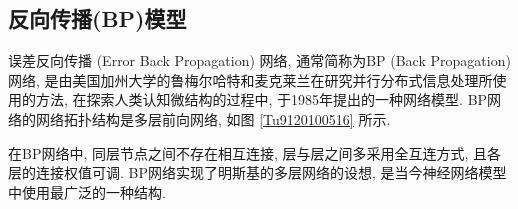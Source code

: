 \subsection{反向传播(BP)模型}
误差反向传播 (Error Back Propagation) 网络, 通常简称为BP (Back Propagation) 网络, 是由美国加州大学的鲁梅尔哈特和麦克莱兰在研究并行分布式信息处理所使用的方法, 在探索人类认知微结构的过程中, 于1985年提出的一种网络模型.
BP网络的网络拓扑结构是多层前向网络, 如图 \ref{Tu9120100516} 所示.
\begin{remark}
    在BP网络中, 同层节点之间不存在相互连接, 层与层之间多采用全互连方式, 且各层的连接权值可调. BP网络实现了明斯基的多层网络的设想, 是当今神经网络模型中使用最广泛的一种结构.
\end{remark}
